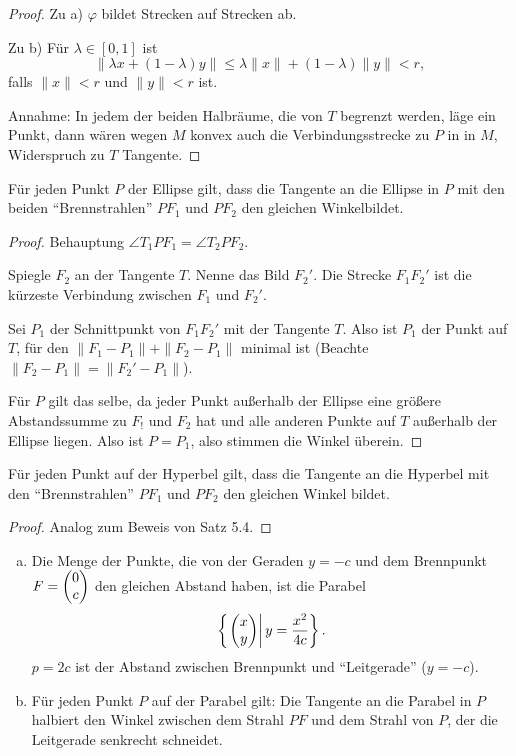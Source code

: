 \documentclass[
 a4paper,
 12pt,
 parskip=half
 ]{scrartcl}
\theoremstyle{plain}
\theoremstyle{definition}
\begin{document}
\begin{proof}
  Zu a) $\varphi$ bildet Strecken auf Strecken ab.

  Zu b) Für $\lambda \in [0,1]$ ist
  \[ \| \lambda x + (1-\lambda ) y \| \le \lambda \| x \| + (1-\lambda) \|y\| <
    r, \]
  falls $\| x \| < r$ und $\| y \| < r$ ist.

  Annahme: In jedem der beiden Halbräume, die von $T$ begrenzt werden, läge ein
  Punkt, dann wären wegen $M$ konvex auch die Verbindungsstrecke zu $P$ in in
  $M$, Widerspruch zu $T$ Tangente.
\end{proof}

\begin{thm}
  Für jeden Punkt $P$ der Ellipse gilt, dass die Tangente an die Ellipse in $P$
  mit den beiden ``Brennstrahlen'' $PF_1$ und $PF_2$ den gleichen
  Winkel\footnotemark bildet.
\end{thm}

\begin{proof}
  Behauptung $\angle T_1 PF_1 = \angle T_2 PF_2$.

  Spiegle $F_2$ an der Tangente $T$. Nenne das Bild $F_2'$. Die Strecke $F_1
  F_2'$ ist die kürzeste Verbindung zwischen $F_1$ und $F_2'$.

  Sei $P_1$ der Schnittpunkt von $F_1 F_2'$ mit der Tangente $T$. Also ist $P_1$
  der Punkt auf $T$, für den $\|F_1 - P_1\| + \| F_2 - P_1 \|$ minimal ist
  (Beachte $\|F_2 - P_1\|=\|F_2' - P_1\|$).

  Für $P$ gilt das selbe, da jeder Punkt außerhalb der Ellipse eine größere
  Abstandssumme zu $F_!$ und $F_2$ hat und alle anderen Punkte auf $T$ außerhalb
  der Ellipse liegen. Also ist $P=P_1$, also stimmen die Winkel überein.
\end{proof}

\begin{thm}
  Für jeden Punkt auf der Hyperbel gilt, dass die Tangente an die Hyperbel mit
  den ``Brennstrahlen'' $PF_1$ und $PF_2$ den gleichen Winkel bildet.
\end{thm}

\begin{proof}
  Analog zum Beweis von Satz 5.4.
\end{proof}

\begin{thm}
  \begin{enumerate}[a)]
    \item Die Menge der Punkte, die von der Geraden $y= -c$ und dem Brennpunkt
      $F= \begin{pmatrix}0\\c\end{pmatrix}$ den gleichen Abstand haben, ist die Parabel
      \[ \left\{ \left. \begin{pmatrix}x\\y\end{pmatrix} \right| y = \frac{x^2}{4c} \right\}. \]
      $p = 2c$ ist der Abstand zwischen Brennpunkt und ``Leitgerade'' ($y=-c$).
    \item Für jeden Punkt $P$ auf der Parabel gilt: Die Tangente an die Parabel
      in $P$ halbiert den Winkel zwischen dem Strahl $PF$ und dem Strahl von
      $P$, der die Leitgerade senkrecht schneidet.
  \end{enumerate}
\end{thm}
\end{document}

